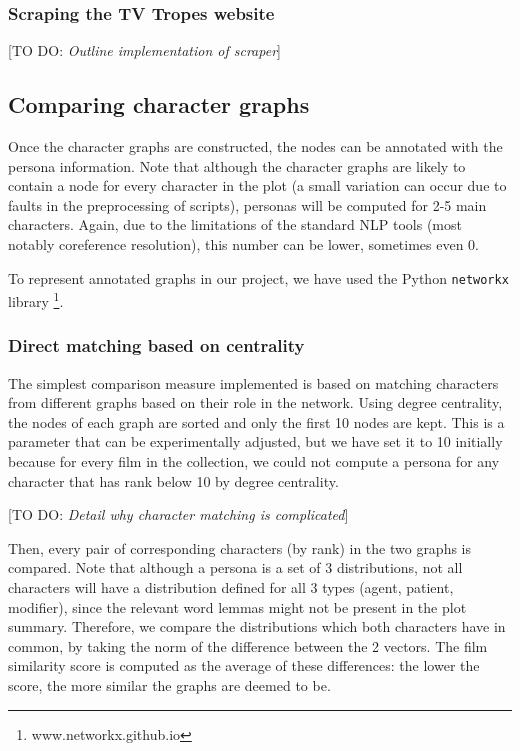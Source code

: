 \documentclass[bsc,frontabs,singlespacing,parskip]{infthesis} %
\begin{document}
\subsubsection{Scraping the TV Tropes website}
[TO DO: \textit{Outline implementation of scraper}]

\subsection{Comparing character graphs}
Once the character graphs are constructed, the nodes can be annotated with the persona information. Note that although the character graphs are likely to contain a node for every character in the plot (a small variation can occur due to faults in the preprocessing of scripts), personas will be computed for 2-5 main characters. Again, due to the limitations of the standard NLP tools (most notably coreference resolution), this number can be lower, sometimes even 0.

To represent annotated graphs in our project, we have used the Python \texttt{networkx} library \footnote{www.networkx.github.io}.

\subsubsection{Direct matching based on centrality}
The simplest comparison measure implemented is based on matching characters from different graphs based on their role in the network. Using degree centrality, the nodes of each graph are sorted and only the first 10 nodes are kept. This is a parameter that can be experimentally adjusted, but we have set it to 10 initially because for every film in the collection, we could not compute a persona for any character that has rank below 10 by degree centrality.

[TO DO: \textit{Detail why character matching is complicated}]

Then, every pair of corresponding characters (by rank) in the two graphs is compared. Note that although a persona is a set of 3 distributions, not all characters will have a distribution defined for all 3 types (agent, patient, modifier), since the relevant word lemmas might not be present in the plot summary. Therefore, we compare the distributions which both characters have in common, by taking the norm of the difference between the 2 vectors. The film similarity score is computed as the average of these differences: the lower the score, the more similar the graphs are deemed to be.
\end{document}
